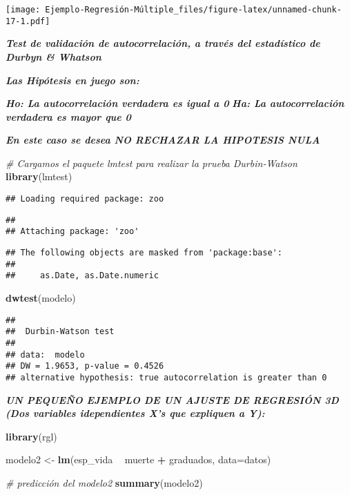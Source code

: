 \documentclass[]{article}
\newenvironment{Shaded}{\begin{snugshade}}{\end{snugshade}}
\newcommand{\KeywordTok}[1]{\textcolor[rgb]{0.13,0.29,0.53}{\textbf{#1}}}
\newcommand{\DataTypeTok}[1]{\textcolor[rgb]{0.13,0.29,0.53}{#1}}
\newcommand{\StringTok}[1]{\textcolor[rgb]{0.31,0.60,0.02}{#1}}
\newcommand{\CommentTok}[1]{\textcolor[rgb]{0.56,0.35,0.01}{\textit{#1}}}
\newcommand{\OperatorTok}[1]{\textcolor[rgb]{0.81,0.36,0.00}{\textbf{#1}}}
\newcommand{\NormalTok}[1]{#1}
\begin{document}
\texttt{[image: Ejemplo-Regresión-Múltiple\_files/figure-latex/unnamed-chunk-17-1.pdf]}

\emph{\textbf{Test de validación de autocorrelación, a través del
estadístico de Durbyn \& Whatson}}

\emph{\textbf{Las Hipótesis en juego son:}}

\emph{\textbf{Ho: La autocorrelación verdadera es igual a 0}}
\emph{\textbf{Ha: La autocorrelación verdadera es mayor que 0}}

\emph{\textbf{En este caso se desea NO RECHAZAR LA HIPOTESIS NULA}}

\begin{Shaded}
\begin{Highlighting}[]
\CommentTok{# Cargamos el paquete lmtest para realizar la prueba Durbin-Watson}
\KeywordTok{library}\NormalTok{(lmtest) }
\end{Highlighting}
\end{Shaded}

\begin{verbatim}
## Loading required package: zoo
\end{verbatim}

\begin{verbatim}
## 
## Attaching package: 'zoo'
\end{verbatim}

\begin{verbatim}
## The following objects are masked from 'package:base':
## 
##     as.Date, as.Date.numeric
\end{verbatim}

\begin{Shaded}
\begin{Highlighting}[]
\KeywordTok{dwtest}\NormalTok{(modelo)}
\end{Highlighting}
\end{Shaded}

\begin{verbatim}
## 
##  Durbin-Watson test
## 
## data:  modelo
## DW = 1.9653, p-value = 0.4526
## alternative hypothesis: true autocorrelation is greater than 0
\end{verbatim}

\emph{\textbf{UN PEQUEÑO EJEMPLO DE UN AJUSTE DE REGRESIÓN 3D (Dos
variables idependientes X's que expliquen a Y):}}

\begin{Shaded}
\begin{Highlighting}[]
\KeywordTok{library}\NormalTok{(rgl)}

\NormalTok{modelo2 <-}\StringTok{ }\KeywordTok{lm}\NormalTok{(esp_vida }\OperatorTok{~}\StringTok{ }\NormalTok{muerte }\OperatorTok{+}\StringTok{ }\NormalTok{graduados, }\DataTypeTok{data=}\NormalTok{datos)}

\CommentTok{# predicción del modelo2}
\KeywordTok{summary}\NormalTok{(modelo2)}
\end{Highlighting}
\end{Shaded}
\end{document}
